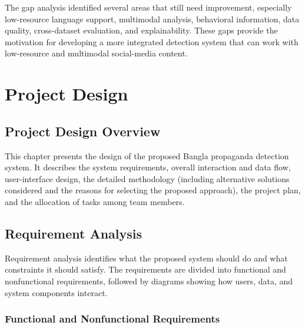 \documentclass[12pt,a4paper]{report}
\begin{document}
The gap analysis identified several areas that still need improvement, especially
low-resource language support, multimodal analysis, behavioral information, data
quality, cross-dataset evaluation, and explainability. These gaps provide the
motivation for developing a more integrated detection system that can work with
low-resource and multimodal social-media content.

\chapter{Project Design}
\label{ch:design}

\section{Project Design Overview}
This chapter presents the design of the proposed Bangla propaganda detection
system. It describes the system requirements, overall interaction and data flow,
user-interface design, the detailed methodology (including alternative solutions
considered and the reasons for selecting the proposed approach), the project plan,
and the allocation of tasks among team members.

\section{Requirement Analysis}
Requirement analysis identifies what the proposed system should do and what
constraints it should satisfy. The requirements are divided into functional and
nonfunctional requirements, followed by diagrams showing how users, data, and
system components interact.

\subsection{Functional and Nonfunctional Requirements}
\end{document}
